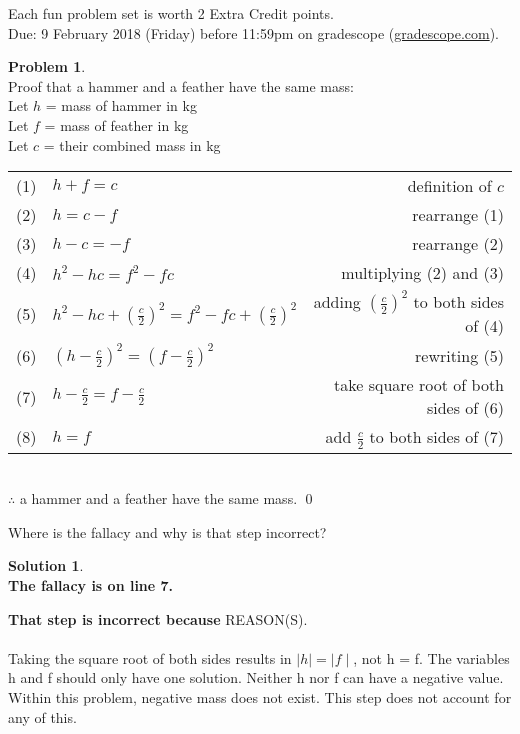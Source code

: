 \documentclass{article}
\theoremstyle{definition}
\newtheorem{problem}{Problem}
\newtheorem*{solution}{Solution}
\begin{document}
\noindent
Each fun problem set is worth 2 Extra Credit points.\\
Due: 9 February 2018 (Friday) before 11:59pm on gradescope (\url{gradescope.com}).\\

\noindent
\begin{problem}\ \\
\noindent
Proof that a hammer and a feather have the same mass:\\
Let $h$ = mass of hammer in kg\\
Let $f$ = mass of feather in kg\\
Let $c$ = their combined mass in kg\\
\begin{tabular}{llr}
(1) & $h+f=c$ & definition of $c$\\
(2) & $h=c-f$ & rearrange (1)\\
(3) & $h-c=-f$ & rearrange (2)\\
(4) & $h^2-hc=f^2-fc$ & multiplying (2) and (3)\\
(5) & $h^2-hc+\left(\frac{c}{2}\right)^2=f^2-fc+(\frac{c}{2})^2$ &  adding $\left(\frac{c}{2}\right)^2$ to both sides of (4)\\
(6) & $\left(h-\frac{c}{2}\right)^2=\left(f-\frac{c}{2}\right)^2$ & rewriting (5)\\
(7) & $h-\frac{c}{2}=f-\frac{c}{2}$ & take square root of both sides of (6)\\
(8) & $h=f$ & add $\frac{c}{2}$ to both sides of (7)
\end{tabular}\\

\noindent
$\therefore$ a hammer and a feather have the same mass. \qed

\vspace{12pt}
\noindent
Where is the fallacy and why is that step incorrect?
\end{problem}

\begin{solution}\ \\
\textbf{The fallacy is on line 7.}\\

\vspace{12pt}

\noindent
\textbf{That step is incorrect because} REASON(S). \ \\
\ \\
Taking the square root of both sides results in $ \mid h \mid  = \mid f \mid $, not h = f. The variables h and f should only have one solution. Neither h nor f can have a negative value. Within this problem, negative mass does not exist. This step does not account for any of this.  
\end{solution}
\end{document}
